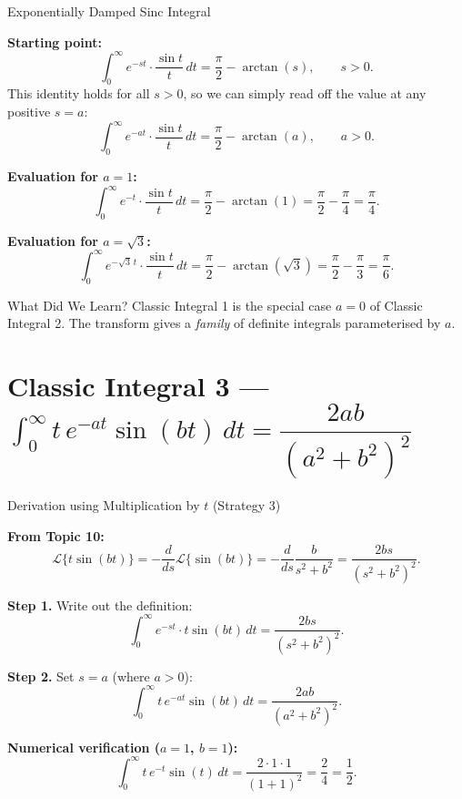\documentclass[12pt,a4paper]{article}
\begin{document}
\begin{infobox}{Exponentially Damped Sinc Integral}

\textbf{Starting point:}
\[
  \int_0^\infty e^{-st}\cdot\frac{\sin t}{t}\, dt = \frac{\pi}{2} - \arctan(s),
  \qquad s > 0.
\]
This identity holds for all $s > 0$, so we can simply read off the value at any
positive $s = a$:
\[
  \boxed{\int_0^\infty e^{-at}\cdot\frac{\sin t}{t}\, dt
  = \frac{\pi}{2} - \arctan(a), \qquad a > 0.}
\]

\textbf{Evaluation for $a = 1$:}
\[
  \int_0^\infty e^{-t}\cdot\frac{\sin t}{t}\, dt
  = \frac{\pi}{2} - \arctan(1)
  = \frac{\pi}{2} - \frac{\pi}{4}
  = \frac{\pi}{4}.
\]

\textbf{Evaluation for $a = \sqrt{3}$:}
\[
  \int_0^\infty e^{-\sqrt{3}\,t}\cdot\frac{\sin t}{t}\, dt
  = \frac{\pi}{2} - \arctan(\sqrt{3})
  = \frac{\pi}{2} - \frac{\pi}{3}
  = \frac{\pi}{6}.
\]

\end{infobox}

\begin{learnbox}{What Did We Learn?}
Classic Integral 1 is the special case $a = 0$ of Classic Integral 2. The
transform gives a \emph{family} of definite integrals parameterised by $a$.
\end{learnbox}

\section{Classic Integral 3 --- $\int_0^\infty t\,e^{-at}\sin(bt)\, dt
         = \dfrac{2ab}{(a^2+b^2)^2}$}

\begin{infobox}{Derivation using Multiplication by $t$ (Strategy 3)}

\textbf{From Topic 10:}
\[
  \mathcal{L}\{t\sin(bt)\} = -\frac{d}{ds}\mathcal{L}\{\sin(bt)\}
  = -\frac{d}{ds}\frac{b}{s^2+b^2}
  = \frac{2bs}{(s^2+b^2)^2}.
\]

\textbf{Step 1.} Write out the definition:
\[
  \int_0^\infty e^{-st}\cdot t\sin(bt)\, dt = \frac{2bs}{(s^2+b^2)^2}.
\]

\textbf{Step 2.} Set $s = a$ (where $a > 0$):
\[
  \boxed{\int_0^\infty t\,e^{-at}\sin(bt)\, dt = \frac{2ab}{(a^2+b^2)^2}.}
\]

\textbf{Numerical verification ($a=1$, $b=1$):}
\[
  \int_0^\infty t\,e^{-t}\sin(t)\, dt
  = \frac{2\cdot 1\cdot 1}{(1+1)^2}
  = \frac{2}{4}
  = \frac{1}{2}.
\]

\end{infobox}
\end{document}
